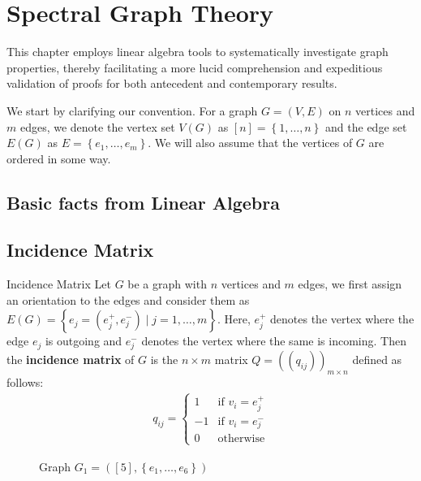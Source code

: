 \documentclass[../basic_graph_theory.tex]{subfiles}
\begin{document}
\chapter{Spectral Graph Theory}
\setcounter{chapter}{8} %
\setcounter{section}{0}
\setcounter{equation}{0}
\setcounter{figure}{0}

This chapter employs linear algebra tools to systematically investigate graph properties, thereby facilitating a more lucid comprehension and expeditious validation of proofs for both antecedent and contemporary results.

We start by clarifying our convention. For a graph $ G = (V, E) $ on $ n $ vertices and $ m $ edges, we denote the vertex set $ V(G) $ as $ [n] = \left\{ 1, \dots, n \right\} $ and the edge set $ E(G) $ as $ E = \left\{ e_{1}, \dots, e_{m} \right\} $. We will also assume that the vertices of $ G $ are ordered in some way.

\section{Basic facts from Linear Algebra}


\section{Incidence Matrix}

\begin{Def}{}{Incidence Matrix}
  Let $G$ be a graph with $n$ vertices and $m$ edges, we first assign an orientation to the edges and consider them as $E(G) = \left\{ e_j = \left( e_j^{+}, e_j^{-} \right) \mid j = 1, \dots, m \right\} $. Here, $ e_j^{+} $ denotes the vertex where the edge \(e_j\) is outgoing and $ e_j^{-} $ denotes the vertex where the same is incoming. Then the \textbf{incidence matrix} of $G$ is the $n \times m$ matrix $Q = \left( (q_{ij}) \right)_{m \times n}$ defined as follows:
  \begin{align*}
    q_{ij} = \begin{cases}
               1  & \text{if } v_{i} = e_{j}^{+} \\
               -1 & \text{if } v_{i} = e_{j}^{-} \\
               0  & \text{otherwise}
             \end{cases}
  \end{align*}
\end{Def}

\begin{figure}[hbt]
  \centering
  \label{fig:incidence}
  \caption{Graph $G_1 = \left( [5], \left\{ e_1, \dots, e_6 \right\}  \right)$}
\end{figure}
\end{document}
